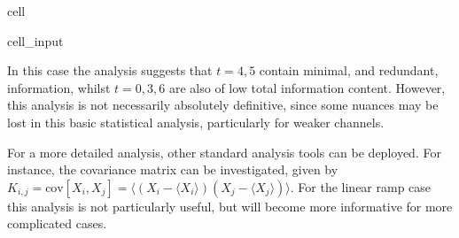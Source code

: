 \documentclass[letterpaper,table,10pt,english]{jupyterBook}
\begin{document}
\begin{sphinxuseclass}{cell}\begin{sphinxVerbatimInput}

\begin{sphinxuseclass}{cell_input}
\begin{sphinxVerbatim}[commandchars=\\\{\}]
\PYG{p}{[}\PYG{p}{]}
\end{sphinxVerbatim}

\end{sphinxuseclass}\end{sphinxVerbatimInput}

\end{sphinxuseclass}
\sphinxAtStartPar
In this case the analysis suggests that \(t=4,5\) contain minimal, and redundant, information, whilst \(t=0,3,6\) are also of low total information content. However, this analysis is not necessarily absolutely definitive, since some nuances may be lost in this basic statistical analysis, particularly for weaker channels.

\sphinxAtStartPar
For a more detailed analysis, other standard analysis tools can be deployed. For instance, the covariance matrix can be investigated, given by \(K_{i,j}=\textrm{cov}[X_{i},X_{j}]=\langle(X_{i}-\langle X_{i}\rangle)(X_{j}-\langle X_{j}\rangle)\rangle\). For the linear ramp case this analysis is not particularly useful, but will become more informative for more complicated cases.
\end{document}
